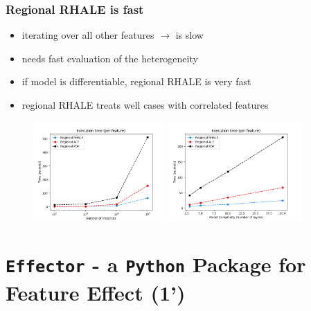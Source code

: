 \documentclass{beamer}
\begin{document}
\begin{frame}
  \frametitle{Regional RHALE is fast}
  \begin{itemize}
  \item iterating over all other features $\rightarrow$ is slow
  \item needs fast evaluation of the heterogeneity
  \item if model is differentiable, regional RHALE is very fast
  \item regional RHALE treats well cases with correlated features
  \end{itemize}
  \begin{figure}[ht]
    \centering
    \includegraphics[width=0.45\textwidth]{./figures/simulation_2/efficiency_samples.png}
    \includegraphics[width=0.45\textwidth]{./figures/simulation_2/efficiency_layers.png}
  \end{figure}
\end{frame}

\section{\texttt{Effector} - a \texttt{Python} Package for Feature Effect (1')}
\end{document}
